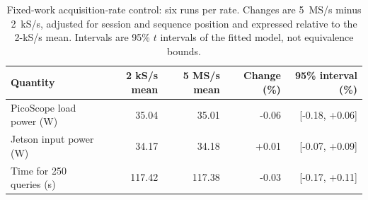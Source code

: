 \begin{table}[htbp]
\centering\small
\caption{Fixed-work acquisition-rate control: six runs per rate. Changes are 5~MS/s minus 2~kS/s, adjusted for session and sequence position and expressed relative to the 2-kS/s mean. Intervals are 95\% $t$ intervals of the fitted model, not equivalence bounds.}
\label{tab:controlled}
\begin{tabular}{@{}lrrrr@{}}
\toprule
Quantity & 2 kS/s mean & 5 MS/s mean & Change (\%) & 95\% interval (\%) \\
\midrule
PicoScope load power (W) & 35.04 & 35.01 & -0.06 & [-0.18, +0.06] \\
Jetson input power (W) & 34.17 & 34.18 & +0.01 & [-0.07, +0.09] \\
Time for 250 queries (s) & 117.42 & 117.38 & -0.03 & [-0.17, +0.11] \\
\bottomrule
\end{tabular}
\end{table}
